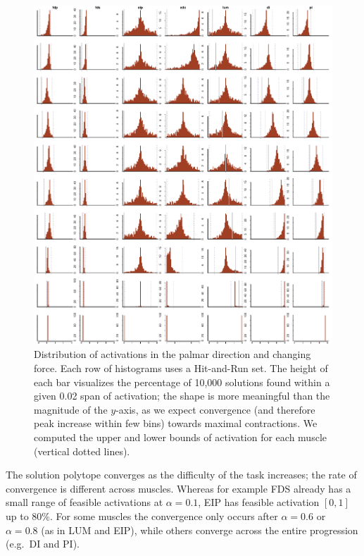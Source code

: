 \begin{figure}[htbp]
\centering
\includegraphics[width=\textwidth]{figs/Z_alphaProgression1430924065026.pdf}
\caption{Distribution of activations in the palmar direction and changing force. Each row of histograms uses a Hit-and-Run set. The height of each bar visualizes the percentage of 10,000 solutions found within a given 0.02 span of activation; the shape is more meaningful than the magnitude of the $y$-axis, as we expect convergence (and therefore peak increase within few bins) towards maximal contractions. We computed the upper and lower bounds of activation for each muscle (vertical dotted lines).}
\label{fig:Z_progression}
\end{figure}

The solution polytope converges as the difficulty of the task increases; the rate of convergence is different across muscles.
Whereas for example FDS already has a small range of feasible activations at $\alpha=0.1$, EIP has feasible activation $[0,1]$ up to 80\%.
For some muscles the convergence only occurs after $\alpha=0.6$ or $\alpha=0.8$ (as in LUM and EIP), while others converge across the entire progression (e.g.\ DI and PI).

